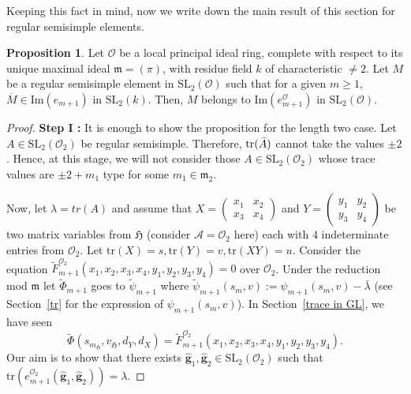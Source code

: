 \documentclass[10pt,twoside]{amsart}
\newcommand{\SL}{\mathrm{SL}}
\newcommand{\tr}{\mathrm{tr}}
\newcommand{\im}{\mathrm{Im}}
\newcommand{\R}{\mathcal{O}_2}
\theoremstyle{definition}
\theoremstyle{definition}
\newtheorem{proposition}[theorem]{Proposition}
\begin{document}
Keeping this fact in mind, now we write down the main result of this section for regular semisimple elements.
\begin{proposition}{\label{regsem1}}
Let $\mathcal{O}$ be a local principal ideal ring, complete with respect to its unique maximal ideal $\mathfrak{m}=(\pi)$, with residue field $k$ of characteristic $\neq 2$. Let $M$ be a regular semisimple element in $\SL_2(\mathcal{O})$ such that for a given $m\geq 1$, $\overline{M}\in \im(e_{m+1})$ in $\SL_2(k)$. Then, $M$ belongs to $\im(e_{m+1}^{\mathcal{O}})$ in $\SL_2(\mathcal{O})$.
\end{proposition}
\begin{proof}
\textbf{Step I :} It is enough to show the proposition for the length two case. Let $A\in \SL_2(\R)$ be regular semisimple. 
Therefore, $\tr(\Bar{A})$ cannot take the values $\pm 2$. Hence, at this stage, we will not consider those $A\in \SL_2(\R)$ whose trace values are $\pm 2 + m_1$ type for some $m_1\in \mathfrak{m}_2$. 

Now, let $\lambda = tr(A)$ and assume that $X =\left (\begin{array}{cc} x_1& x_2 \\x_3&x_4 \end{array}\right )$ and $Y = \left (\begin{array}{cc} y_1&y_2  \\ y_3&y_4 \end{array} \right )$ be two matrix variables from $\mathfrak{H}$ (consider $\mathcal{A} = \mathcal{O}_2$ here) each with $4$ indeterminate entries from $\R$. Let $\tr(X)=s, \tr(Y)=v, \tr(XY)=u$. Consider the equation $\widetilde F_{m+1}^{\R}(x_1, x_2, x_3, x_4, y_1, y_2, y_3, y_4) = 0$ over $\mathcal{O}_2$. Under the reduction mod $\mathfrak{m}$ let $\tilde \Phi_{m+1}$ goes to $\tilde \psi_{m+1}$ where $\tilde \psi_{m+1}(s_m, v) := \psi_{m+1}(s_m, v) - \bar \lambda$ (see Section~\ref{tr} for the expression of $\psi_{m+1}(s_m,v)$). In Section~\ref{trace in GL}, we have seen 
$$\widetilde \Phi(s_{m_{\mathfrak{H}}}, v_{\mathfrak{H}}, d_{Y}, d_X) = \widetilde F_{m+1}^{\R}(x_1, x_2, x_3, x_4, y_1, y_2, y_3, y_4).$$
Our aim is to show that there exists $\widehat{\mathbf{g}}_1, \widehat{\mathbf{g}}_2 \in \SL_2(\R)$ such that $\tr(e_{m+1}^{\R}(\widehat{\mathbf{g}}_1, \widehat{\mathbf{g}}_2)) = \lambda$. 


\end{proof}
\end{document}
